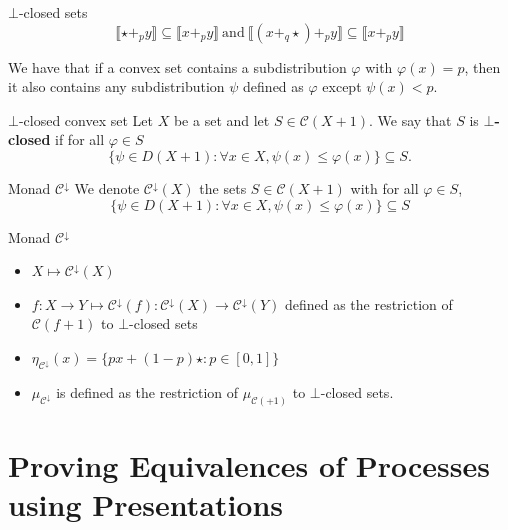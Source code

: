\documentclass{beamer}
\newcommand{\C}{\mathcal C}
\begin{document}
\begin{frame}{$\bot$-closed sets}
$$\llbracket \star +_p y \rrbracket \subseteq \llbracket x+_p y \rrbracket ~\text{and}~\llbracket (x+_q \star) +_p y \rrbracket \subseteq \llbracket x+_p y \rrbracket$$

    
    \pause
    \vspace{0.5cm}
    We have that if a convex set contains a subdistribution $\varphi$ with $\varphi(x)=p$, then it also contains any subdistribution $\psi$ defined as $\varphi$ except $\psi(x) < p$.
    \vspace{0.5cm}
    \pause
    \begin{block}{$\bot$-closed convex set}
    Let $X$ be a set and let $S \in \C(X + 1)$. We say that $S$ is \textbf{$\bot$-closed} if for all $\varphi \in S$ 
    $$\{\psi \in D(X + 1) : \forall x \in X, \psi(x) \leq \varphi(x)\} \subseteq S.$$
    \end{block}
    
\end{frame}

\begin{frame}{Monad $\C^{\downarrow}$}
We denote $\C^\downarrow(X)$ the sets $S \in \C(X+1)$ with for all $\varphi \in S$, $$\{\psi \in D(X + 1) : \forall x \in X, \psi(x) \leq \varphi(x)\} \subseteq S$$
\pause

\begin{block}{Monad $\C^{\downarrow}$} 

\begin{itemize}
    \item $X \longmapsto \C^{\downarrow}(X)$
    \item $f\colon X \to Y \longmapsto \C^{\downarrow}(f)\colon \C^{\downarrow}(X) \to \C^{\downarrow}(Y)$ defined as the restriction of $\C(f+1)$ to $\bot$-closed sets
    \item $\eta_{\C^{\downarrow}}(x) = \{p x + (1-p)\star : p \in [0,1]\}$
    \item $\mu_{\C^{\downarrow}}$ is defined as the restriction of $\mu_{\C(+1)}$ to $\bot$-closed sets.
\end{itemize}
\end{block}
\end{frame}

\part{Proving Equivalences of Processes using Presentations}\frame{\partpage}
\end{document}
